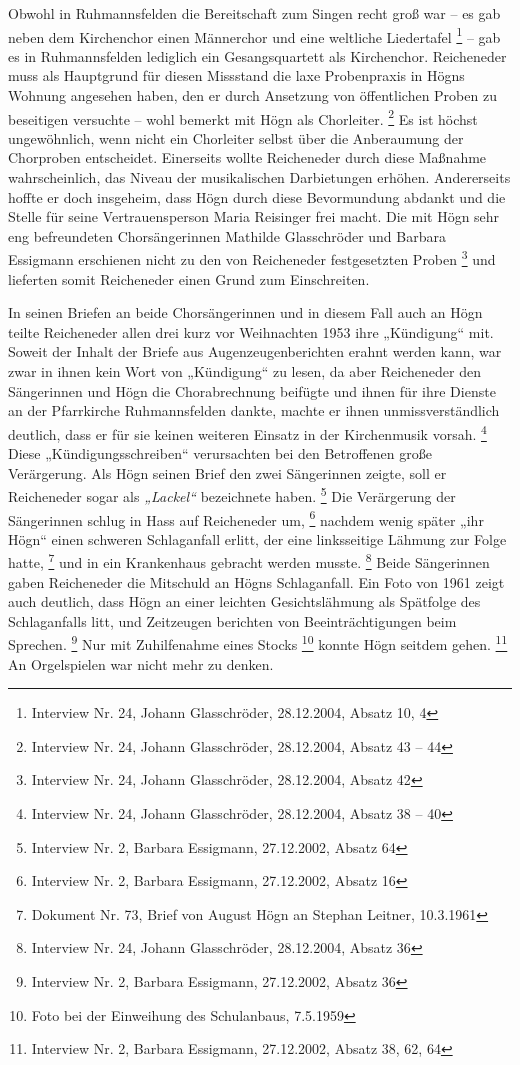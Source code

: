 \documentclass[a4paper]{article}
\newcommand\textstyleZitate[1]{\textit{#1}}
\begin{document}
Obwohl in Ruhmannsfelden die Bereitschaft zum Singen recht groß war – es
gab neben dem Kirchenchor einen Männerchor und eine weltliche
Liedertafel \footnote{Interview Nr. 24, Johann Glasschröder,
28.12.2004, Absatz 10, 4 } – gab es in Ruhmannsfelden lediglich ein
Gesangsquartett als Kirchenchor. Reicheneder muss als Hauptgrund für
diesen Missstand die laxe Probenpraxis in Högns Wohnung angesehen
haben, den er durch Ansetzung von öffentlichen Proben zu beseitigen
versuchte – wohl bemerkt mit Högn als Chorleiter. \footnote{Interview
Nr. 24, Johann Glasschröder, 28.12.2004, Absatz 43 – 44} Es ist höchst
ungewöhnlich, wenn nicht ein Chorleiter selbst über die Anberaumung der
Chorproben entscheidet. Einerseits wollte Reicheneder durch diese
Maßnahme wahrscheinlich, das Niveau der musikalischen Darbietungen
erhöhen. Andererseits hoffte er doch insgeheim, dass Högn durch diese
Bevormundung abdankt und die Stelle für seine Vertrauensperson Maria
Reisinger frei macht. Die mit Högn sehr eng befreundeten
Chorsängerinnen Mathilde Glasschröder und Barbara Essigmann erschienen
nicht zu den von Reicheneder festgesetzten Proben \footnote{Interview
Nr. 24, Johann Glasschröder, 28.12.2004, Absatz 42} und lieferten somit
Reicheneder einen Grund zum Einschreiten.

In seinen Briefen an beide Chorsängerinnen und in diesem Fall auch an
Högn teilte Reicheneder allen drei kurz vor Weihnachten 1953 ihre
„Kündigung“ mit. Soweit der Inhalt der Briefe aus Augenzeugenberichten
erahnt werden kann, war zwar in ihnen kein Wort von „Kündigung“ zu
lesen, da aber Reicheneder den Sängerinnen und Högn die Chorabrechnung
beifügte und ihnen für ihre Dienste an der Pfarrkirche Ruhmannsfelden
dankte, machte er ihnen unmissverständlich deutlich, dass er für sie
keinen weiteren Einsatz in der Kirchenmusik vorsah. \footnote{Interview
Nr. 24, Johann Glasschröder, 28.12.2004, Absatz 38 – 40} Diese
„Kündigungsschreiben“ verursachten bei den Betroffenen große
Verärgerung. Als Högn seinen Brief den zwei Sängerinnen zeigte, soll er
Reicheneder sogar als \textstyleZitate{„Lackel“} bezeichnete
haben. \footnote{Interview Nr. 2, Barbara Essigmann, 27.12.2002, Absatz
64} Die Verärgerung der Sängerinnen schlug in Hass auf Reicheneder
um, \footnote{Interview Nr. 2, Barbara Essigmann, 27.12.2002, Absatz
16} nachdem wenig später „ihr Högn“ einen schweren Schlaganfall erlitt,
der eine linksseitige Lähmung zur Folge hatte, \footnote{Dokument Nr.
73, Brief von August Högn an Stephan Leitner, 10.3.1961} und in ein
Krankenhaus gebracht werden musste. \footnote{Interview Nr. 24, Johann
Glasschröder, 28.12.2004, Absatz 36} Beide Sängerinnen gaben
Reicheneder die Mitschuld an Högns Schlaganfall. Ein Foto von 1961
zeigt auch deutlich, dass Högn an einer leichten Gesichtslähmung als
Spätfolge des Schlaganfalls litt, und Zeitzeugen berichten von
Beeinträchtigungen beim Sprechen. \footnote{Interview Nr. 2, Barbara
Essigmann, 27.12.2002, Absatz 36} Nur mit Zuhilfenahme eines
Stocks \footnote{Foto bei der Einweihung des Schulanbaus, 7.5.1959}
konnte Högn seitdem gehen. \footnote{Interview Nr. 2, Barbara
Essigmann, 27.12.2002, Absatz 38, 62, 64} An Orgelspielen war nicht
mehr zu denken.
\end{document}
